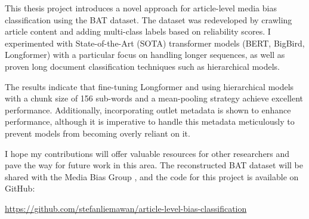 This thesis project introduces a novel approach for article-level media bias classification using the BAT dataset. The dataset was redeveloped by crawling article content and adding multi-class labels based on reliability scores. I experimented with State-of-the-Art (SOTA) transformer models (BERT, BigBird, Longformer) with a particular focus on handling longer sequences, as well as proven long document classification techniques such as hierarchical models.

The results indicate that fine-tuning Longformer and using hierarchical models with a chunk size of 156 sub-words and a mean-pooling strategy achieve excellent performance. Additionally, incorporating outlet metadata is shown to enhance performance, although it is imperative to handle this metadata meticulously to prevent models from becoming overly reliant on it.

I hope my contributions will offer valuable resources for other researchers and pave the way for future work in this area. The reconstructed BAT dataset will be shared with the Media Bias Group \cite{media-bias-group}, and the code for this project is available on GitHub:

{\footnotesize \url{https://github.com/stefanliemawan/article-level-bias-classification}}


